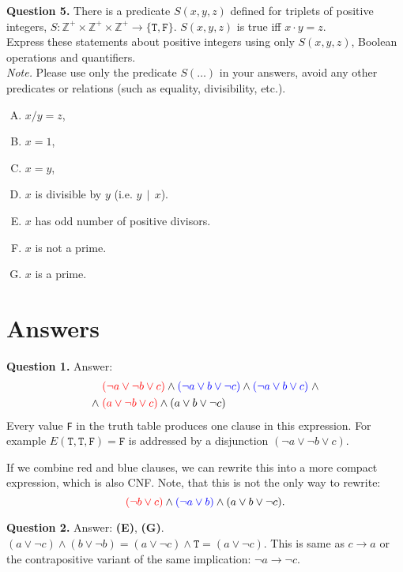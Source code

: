 \documentclass[jou]{apa6}
\begin{document}
\vspace{10pt}
{\bf Question 5.}
There is a predicate $S(x, y, z)$ defined for triplets
of positive integers, 
$S: \mathbb{Z}^{+} \times \mathbb{Z}^{+} \times \mathbb{Z}^{+} \rightarrow \{ \mathtt{T}, \mathtt{F} \}$. 
$S(x,y,z)$ is true iff $x \cdot y = z$.\\
Express these statements about positive integers
using only $S(x,y,z)$, Boolean operations and quantifiers.\\
{\em Note.} Please use only the predicate $S(\ldots)$ in your answers, 
avoid any other predicates or relations (such as equality, divisibility, etc.).

\begin{enumerate}[(A)] 
\item $x/y = z$,
\item $x = 1$,
\item $x = y$, 
\item $x$ is divisible by $y$ (i.e. $y \,\mid\, x$). 
\item $x$ has odd number of positive divisors.
\item $x$ is not a prime.
\item $x$ is a prime.
\end{enumerate}


\section{Answers}

\vspace{6pt}
{\bf Question 1.} Answer: 
\begin{align}
 & \textcolor{red}{(\neg a \vee \neg b \vee c)} \wedge 
\textcolor{blue}{(\neg a \vee b \vee \neg c)} \wedge 
\textcolor{blue}{(\neg a \vee b \vee c)} \;\wedge \nonumber \\
\wedge\; & \textcolor{red}{(a \vee \neg b \vee c)} \wedge 
(a \vee b \vee \neg c) \nonumber
\end{align}
Every value {\tt F} in the truth table produces one 
clause in this expression. For example $E(\mathtt{T},\mathtt{T},\mathtt{F}) = \mathtt{F}$
is addressed by a disjunction $(\neg a \vee \neg b \vee c)$. 

If we combine red and blue clauses, we can rewrite this into a more compact expression, 
which is also CNF. Note, that this is not the only way to rewrite:
$$\textcolor{red}{(\neg b \vee c)} \wedge 
\textcolor{blue}{(\neg a \vee b)} \wedge
(a \vee b \vee \neg c).$$

\vspace{6pt}
{\bf Question 2.} Answer: {\bf (E)}, {\bf (G)}.\\
$(a \vee \neg c) \wedge (b \vee \neg b) = (a \vee \neg c) \wedge \mathtt{T} = (a \vee \neg c)$. 
This is same as $c \rightarrow a$ or the contrapositive variant of the same implication:
$\neg a \rightarrow \neg c$.
\end{document}

